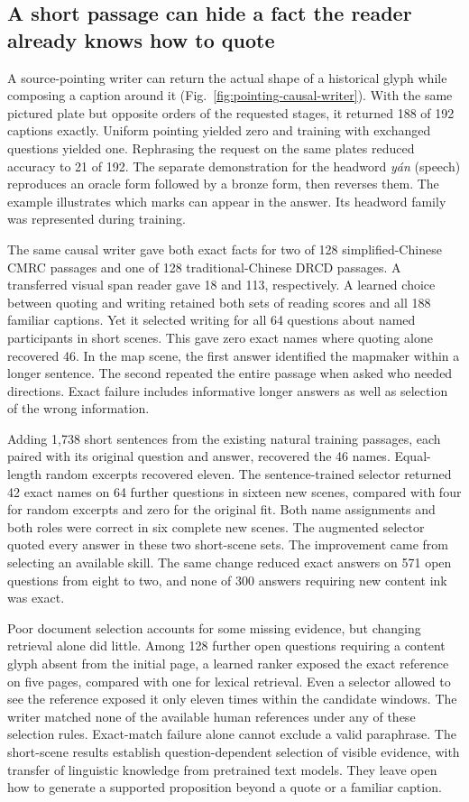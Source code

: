 \subsection*{A short passage can hide a fact the reader already knows how to quote}
A source-pointing writer can return the actual shape of a historical glyph while composing a caption around it (Fig.~\ref{fig:pointing-causal-writer}). With the same pictured plate but opposite orders of the requested stages, it returned 188 of 192 captions exactly. Uniform pointing yielded zero and training with exchanged questions yielded one. Rephrasing the request on the same plates reduced accuracy to 21 of 192. The separate demonstration for the headword \textit{yán} (speech) reproduces an oracle form followed by a bronze form, then reverses them. The example illustrates which marks can appear in the answer. Its headword family was represented during training.

The same causal writer gave both exact facts for two of 128 simplified-Chinese CMRC passages and one of 128 traditional-Chinese DRCD passages. A transferred visual span reader gave 18 and 113, respectively. A learned choice between quoting and writing retained both sets of reading scores and all 188 familiar captions. Yet it selected writing for all 64 questions about named participants in short scenes. This gave zero exact names where quoting alone recovered 46. In the map scene, the first answer identified the mapmaker within a longer sentence. The second repeated the entire passage when asked who needed directions. Exact failure includes informative longer answers as well as selection of the wrong information.

Adding 1,738 short sentences from the existing natural training passages, each paired with its original question and answer, recovered the 46 names. Equal-length random excerpts recovered eleven. The sentence-trained selector returned 42 exact names on 64 further questions in sixteen new scenes, compared with four for random excerpts and zero for the original fit. Both name assignments and both roles were correct in six complete new scenes. The augmented selector quoted every answer in these two short-scene sets. The improvement came from selecting an available skill. The same change reduced exact answers on 571 open questions from eight to two, and none of 300 answers requiring new content ink was exact.

Poor document selection accounts for some missing evidence, but changing retrieval alone did little. Among 128 further open questions requiring a content glyph absent from the initial page, a learned ranker exposed the exact reference on five pages, compared with one for lexical retrieval. Even a selector allowed to see the reference exposed it only eleven times within the candidate windows. The writer matched none of the available human references under any of these selection rules. Exact-match failure alone cannot exclude a valid paraphrase. The short-scene results establish question-dependent selection of visible evidence, with transfer of linguistic knowledge from pretrained text models. They leave open how to generate a supported proposition beyond a quote or a familiar caption.
